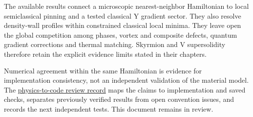 The available results connect a microscopic nearest-neighbor Hamiltonian
to local semiclassical pinning and a tested classical Y gradient sector.
They also resolve density-wall profiles within constrained classical
local minima. They leave open the global competition among phases,
vortex and composite defects, quantum gradient corrections and thermal
matching. Skyrmion and V supersolidity therefore retain the explicit
evidence limits stated in their chapters.

Numerical agreement within the same Hamiltonian is evidence for
implementation consistency, not an independent validation of the
material model. The
\href{../../../GOVERNMENT/Working-Pad/issue-notes/open/260918-nbcp-physics-code-review.md}{physics-to-code
review record} maps the claims to implementation and saved checks,
separates previously verified results from open convention issues, and
records the next independent tests. This document remains in review.
